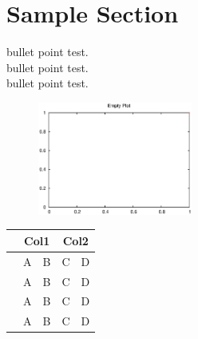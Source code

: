 
\section{Sample Section}
\label{sec-sample}

\nb bullet point test. \\
\nb bullet point test. \\
\nb bullet point test. \\



\begin{figure}[h]
\centerline{
\includegraphics[width=2in]{F/empty.eps}
}
\end{figure}


\begin{table}[th]
\begin{center}
{\small
\begin{tabular}{lcccc}
\hline
{\bf } & \multicolumn{2}{c}{Col1}
       & \multicolumn{2}{c}{Col2} \\
\hline
       &   A   &   B   &   C   &    D   \\
\hline
       &   A   &   B   &   C   &    D   \\
       &   A   &   B   &   C   &    D   \\
\hline
       &   A   &   B   &   C   &    D   \\
\hline
\hline
\end{tabular}
}
\end{center}
\end{table}
